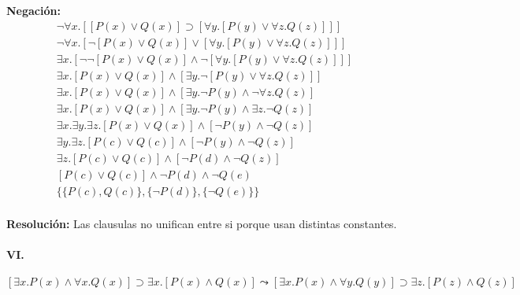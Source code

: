 \documentclass[10pt,a4paper]{article}
\begin{document}
\begin{multicols}{2}
\textbf{Negación:}
\begin{align*}
\lnot \forall x. [[P(x) \lor Q(x)] \supset [\forall y. [P(y) \lor \forall z. Q(z)]]] \\[1pt]
\lnot\forall x. [\lnot [P(x) \lor Q(x)] \lor [\forall y. [P(y) \lor \forall z. Q(z)]]] \\[1pt]
\exists x. [\lnot\lnot [P(x) \lor Q(x)] \land \lnot[\forall y. [P(y) \lor \forall z. Q(z)]]] \\[1pt]
\exists x. [P(x) \lor Q(x)] \land [\exists y.\lnot[P(y) \lor \forall z. Q(z)]] \\[1pt]
\exists x. [P(x) \lor Q(x)] \land [\exists y.\lnot P(y) \land \lnot\forall z. Q(z)]\\[1pt]
\exists x. [P(x) \lor Q(x)] \land [\exists y.\lnot P(y) \land\exists z. \lnot Q(z)]\\[1pt]
\exists x.\exists y. \exists z. [P(x) \lor Q(x)] \land [\lnot P(y) \land \lnot Q(z)]\\[1pt]
\exists y. \exists z. [P(c) \lor Q(c)] \land [\lnot P(y) \land \lnot Q(z)]\\[1pt]
\exists z. [P(c) \lor Q(c)] \land [\lnot P(d) \land \lnot Q(z)]\\[1pt]
[P(c) \lor Q(c)] \land \lnot P(d) \land \lnot Q(e)\\[1pt]
\{\{P(c), Q(c)\}, \{ \lnot P(d)\} , \{\lnot Q(e)\}\}\\[1pt]
\end{align*}

\textbf{Resolución:}
Las clausulas no unifican entre si porque usan distintas constantes.
\end{multicols}

\paragraph{VI.}$ [\exists x. P(x) \land \forall x. Q(x)] \supset \exists x. [P(x) \land Q(x)] \leadsto [\exists x. P(x) \land \forall y. Q(y)] \supset \exists z. [P(z) \land Q(z)]$
\end{document}
